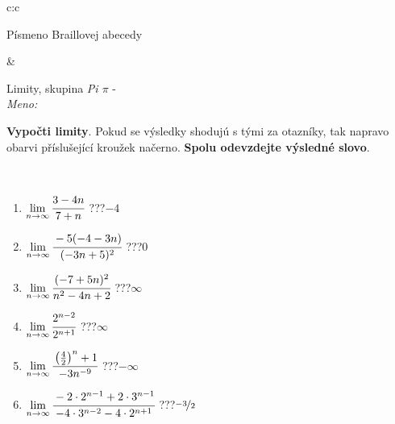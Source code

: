 \documentclass[10pt]{report}
\begin{document}
\begin{tabular}{c:c}
\begin{minipage}[c][104.5mm][t]{0.5\linewidth}
\begin{center}
\begin{minipage}{0.20\linewidth}
\begin{center}
{\small Písmeno Braillovej abecedy}
\end{center}
\end{minipage}
\end{center}
\end{minipage}
&
\begin{minipage}[c][104.5mm][t]{0.5\linewidth}
\begin{center}
\vspace{7mm}
{\huge Limity, skupina \textit{Pi $\pi$} -}\\[5mm]
\textit{Meno:}\phantom{xxxxxxxxxxxxxxxxxxxxxxxxxxxxxxxxxxxxxxxxxxxxxxxxxxxxxxxxxxxxxxxxx}\\[5mm]
\begin{minipage}{0.95\linewidth}
\begin{center}
\textbf{Vypočti limity}. Pokud se výsledky shodujú s tými za otazníky, tak napravo\\obarvi příslušející kroužek načerno. \textbf{Spolu odevzdejte výsledné slovo}.
\end{center}
\end{minipage}
\\[1mm]
\begin{minipage}{0.79\linewidth}
\begin{center}
\begin{varwidth}{\linewidth}
\begin{enumerate}
\normalsize
\item $\lim\limits_{n\to\infty}\cfrac{3-4n}{7+n}$\quad \dotfill\; ???\;\dotfill \quad $-4$
\item $\lim\limits_{n\to\infty}\cfrac{-5(-4-3n)}{(-3n+5)^2}$\quad \dotfill\; ???\;\dotfill \quad $0$
\item $\lim\limits_{n\to\infty}\cfrac{(-7+5n)^2}{n^2-4n+2}$\quad \dotfill\; ???\;\dotfill \quad $\infty$
\item $\lim\limits_{n\to\infty}\cfrac{2^{n-2}}{2^{n+1}}$\quad \dotfill\; ???\;\dotfill \quad $\infty$
\item $\lim\limits_{n\to\infty}\cfrac{\left(\frac{4}{2}\right)^n +1}{-3n^{-9}}$\quad \dotfill\; ???\;\dotfill \quad $-\infty$
\item $\lim\limits_{n\to\infty}\cfrac{-2\cdot 2^{n-1}+2\cdot 3^{n-1}}{-4\cdot 3^{n-2}-4\cdot 2^{n+1}}$\quad \dotfill\; ???\;\dotfill \quad $\nicefrac{-3}{2}$
\end{enumerate}
\end{varwidth}
\end{center}
\end{minipage}
\begin{minipage}{0.20\linewidth}

\end{minipage}
\end{center}
\end{minipage}
\end{tabular}
\end{document}
